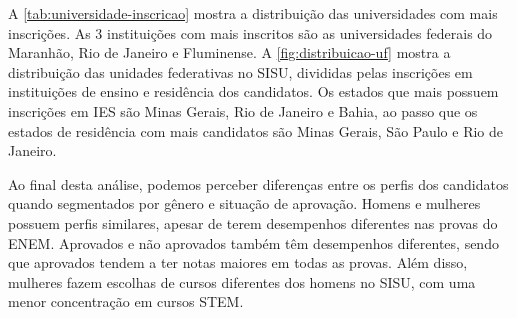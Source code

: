 A \autoref{tab:universidade-inscricao} mostra a distribuição das universidades com mais inscrições. As 3 instituições com mais inscritos são as universidades federais do Maranhão, Rio de Janeiro e Fluminense. A \autoref{fig:distribuicao-uf} mostra a distribuição das unidades federativas no SISU, divididas pelas inscrições em instituições de ensino e residência dos candidatos. Os estados que mais possuem inscrições em IES são Minas Gerais, Rio de Janeiro e Bahia, ao passo que os estados de residência com mais candidatos são Minas Gerais, São Paulo e Rio de Janeiro.

Ao final desta análise, podemos perceber diferenças entre os perfis dos candidatos quando segmentados por gênero e situação de aprovação. Homens e mulheres possuem perfis similares, apesar de terem desempenhos diferentes nas provas do ENEM. Aprovados e não aprovados também têm desempenhos diferentes, sendo que aprovados tendem a ter notas maiores em todas as provas. Além disso, mulheres fazem escolhas de cursos diferentes dos homens no SISU, com uma menor concentração em cursos STEM. 
   
